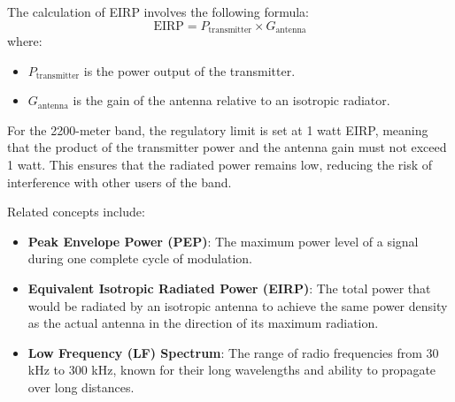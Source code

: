 The calculation of EIRP involves the following formula:
\[
\text{EIRP} = P_{\text{transmitter}} \times G_{\text{antenna}}
\]
where:
\begin{itemize}
    \item \( P_{\text{transmitter}} \) is the power output of the transmitter.
    \item \( G_{\text{antenna}} \) is the gain of the antenna relative to an isotropic radiator.
\end{itemize}

For the 2200-meter band, the regulatory limit is set at 1 watt EIRP, meaning that the product of the transmitter power and the antenna gain must not exceed 1 watt. This ensures that the radiated power remains low, reducing the risk of interference with other users of the band.

Related concepts include:
\begin{itemize}
    \item \textbf{Peak Envelope Power (PEP)}: The maximum power level of a signal during one complete cycle of modulation.
    \item \textbf{Equivalent Isotropic Radiated Power (EIRP)}: The total power that would be radiated by an isotropic antenna to achieve the same power density as the actual antenna in the direction of its maximum radiation.
    \item \textbf{Low Frequency (LF) Spectrum}: The range of radio frequencies from 30 kHz to 300 kHz, known for their long wavelengths and ability to propagate over long distances.
\end{itemize}

